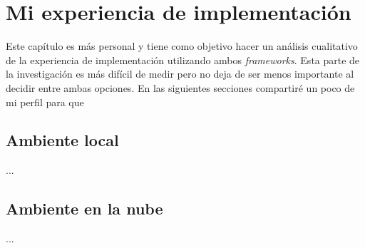 \chapter{Mi experiencia de implementación}

\noindent Este capítulo es más personal y tiene como objetivo hacer un análisis cualitativo de la experiencia de implementación utilizando ambos \textit{frameworks}. Esta parte de la investigación es más difícil de medir pero no deja de ser menos importante al decidir entre ambas opciones. En las siguientes secciones compartiré un poco de mi perfil para que  

\newpage

\section{Ambiente local}

\noindent ...

\section{Ambiente en la nube}

\noindent ...

